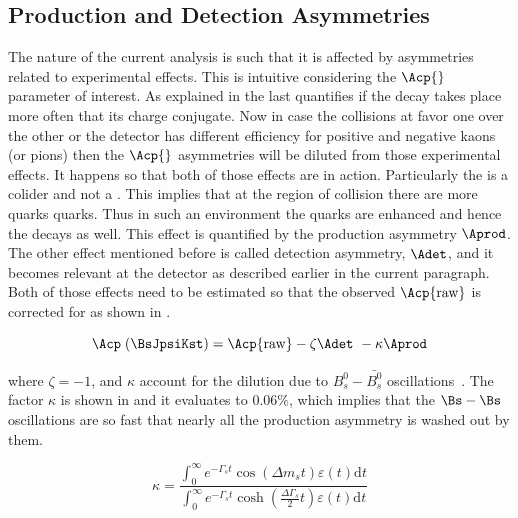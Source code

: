 \subsection{Production and Detection Asymmetries}
\label{experimentalAssym}
The nature of the current analysis is such that it is affected by asymmetries related to experimental effects.
This is intuitive considering the $\Acp{}$ parameter of interest. As explained in 
the last quantifies if the decay \BsJpsiKst takes place more often that its charge conjugate. Now in case the
collisions at \lhc favor one over the other or the detector has different efficiency for positive and negative 
kaons (or pions) then the $\Acp{}$ asymmetries will be diluted from those experimental effects. It happens so that
both of those effects are in action. Particularly the \lhc is a \proton\proton colider and not a \proton\antiproton .
This implies that at the region of collision there are more \bquark quarks \bquarkbar quarks. 
Thus in such an environment the \bquark quarks are enhanced and hence the \BsbarJpsiKst 
decays as well. This effect is quantified by the production asymmetry $\Aprod$. The other effect mentioned before
is called detection asymmetry, $\Adet$, and it becomes relevant at the \lhcb detector as described earlier in the
current paragraph. Both of those effects need to be estimated so that the observed $\Acp{\rm raw}$ is corrected for
as shown in .

\begin{equation}
\Acp\;(\BsJpsiKst) = \Acp{\rm raw} - \zeta \Adet\ - \kappa\Aprod
\label{acp_corrected}
\end{equation}

\noindent where $\zeta = -1$, and $\kappa$ account for the dilution due to $B^0_s-\bar{B^0_s}$ 
oscillations~\cite{LHCb-PAPER-2013-018}. The factor $\kappa$ is shown in  and it evaluates to $0.06\%$, 
which implies that the $\Bs-\Bs$ oscillations are so fast that nearly all the production asymmetry
is washed out by them.

\begin{equation}
 \kappa = \frac{\int_0^\infty  e^{-\Gamma_s t} \cos \!\left( \Delta m_s t \right ) \varepsilon(t)\mathrm{d}t}{\int_0^\infty  e^{-\Gamma_s t} \cosh \left( \frac{\Delta \Gamma_s}{2} t \right ) \varepsilon(t)\mathrm{d}t}
\label{kappa}
\end{equation}

